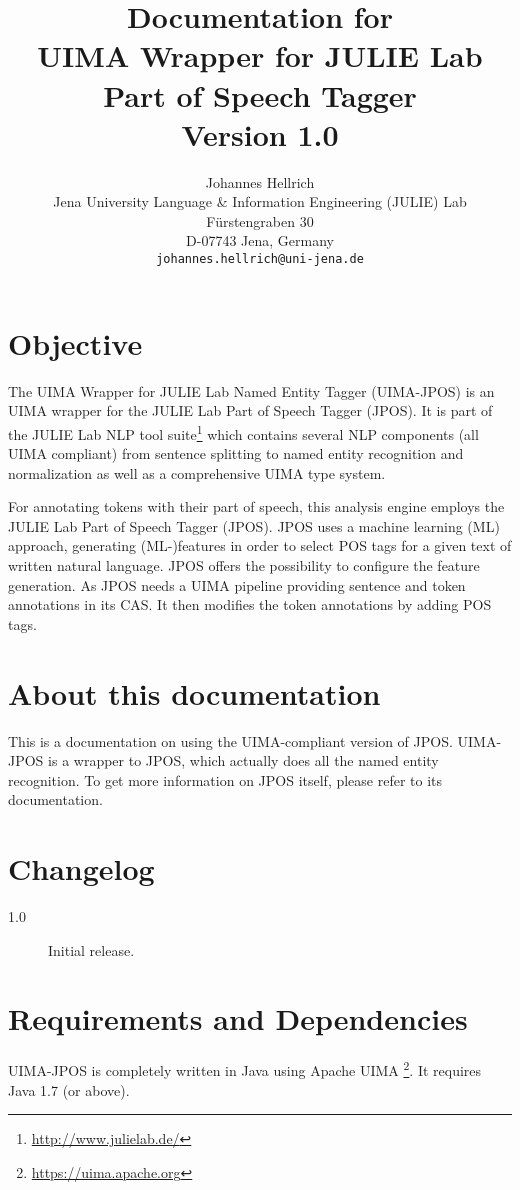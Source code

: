 \documentclass[11pt,a4paper,halfparskip]{scrartcl}
\title{\small{Documentation for}\\\huge UIMA Wrapper for JULIE Lab Part of Speech Tagger\\\vspace{3mm}\small{Version 1.0}}
\author{\normalsize Johannes Hellrich\\
  \normalsize  Jena University Language \& Information Engineering (JULIE) Lab\\
  \normalsize F\"urstengraben 30 \\
  \normalsize D-07743 Jena, Germany\\
  {\normalsize \tt johannes.hellrich@uni-jena.de} }
\date{}
\begin{document}
\maketitle

\section{Objective}

The UIMA Wrapper for JULIE Lab Named Entity Tagger (UIMA-JPOS) is an
UIMA wrapper for the JULIE Lab Part of Speech Tagger (JPOS).  It is part
of the JULIE Lab NLP tool suite\footnote{\url{http://www.julielab.de/}}
which contains several NLP components (all UIMA compliant) from
sentence splitting to named entity recognition and normalization as
well as a comprehensive UIMA type system.

For annotating tokens with their part of speech, this
analysis engine employs the JULIE Lab Part of Speech Tagger (JPOS). JPOS uses a machine learning (ML) approach, generating (ML-)features in order to select POS tags for a
given text of written natural language.  JPOS offers the possibility
to configure the feature generation. As JPOS needs a UIMA pipeline providing sentence and token annotations in its CAS. It then modifies the token annotations by adding POS tags.


\section{About this documentation}
This is a documentation on using the UIMA-compliant version of
JPOS. UIMA-JPOS is a wrapper to JPOS, which actually does all the
named entity recognition. To get more information on JPOS itself,
please refer to its documentation.


\section{Changelog}
\begin{description}
\item[1.0] Initial release.
\end{description}


\section{Requirements and Dependencies}

UIMA-JPOS is completely written in Java using Apache UIMA \footnote{\url{https://uima.apache.org}}. It
requires Java 1.7 (or above).
\end{document}
